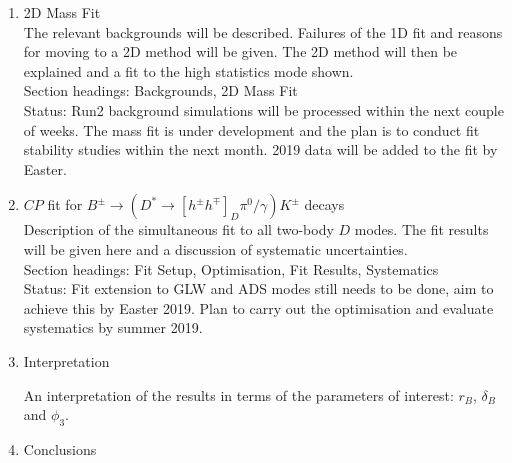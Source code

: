 \documentclass[oneside,12pt]{article}
\begin{document}
\begin{enumerate}
  \item 2D Mass Fit \\

    The relevant backgrounds will be described. Failures of the 1D fit and reasons
    for moving to a 2D method will be given. The 2D method will then be explained
    and a fit to the high statistics mode shown. \\

    Section headings: Backgrounds, 2D Mass Fit \\

    Status: Run2 background simulations will be processed within the next couple of
    weeks. The mass fit is under development and the plan is to conduct fit
    stability studies within the next month. 2019 data will be added to the fit by
    Easter. 

  \item $CP$ fit for $B^{\pm}\rightarrow (D^*\rightarrow
    [h^{\pm}h^{\mp}]_D\pi^0/\gamma)K^{\pm}$ decays \\

    Description of the simultaneous fit to all two-body $D$ modes. The fit results
    will be given here and a discussion of systematic uncertainties. \\

    Section headings: Fit Setup, Optimisation, Fit Results, Systematics \\

    Status: Fit extension to GLW and ADS modes still needs to be done, aim to
    achieve this by Easter 2019. Plan to carry out the optimisation and evaluate
    systematics by summer 2019.

  \item Interpretation 

    An interpretation of the results in terms of the parameters of interest: $r_B$,
    $\delta_B$ and $\phi_3$.

  \item Conclusions

\end{enumerate}

\printbibliography[heading=bibintoc,{title=References}]
\end{document}

